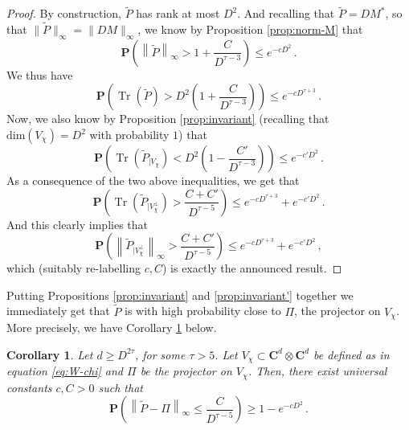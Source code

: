 \documentclass{amsart}
\newtheorem{corollary}[theorem]{Corollary}
\newcommand{\C}{\mathbf{C}}
\renewcommand{\P}{\mathbf{P}}
\renewcommand{\leq}{\leqslant}
\renewcommand{\geq}{\geqslant}
\DeclareMathOperator{\Tr}{Tr}
\begin{document}
\begin{proof}
    By construction, $\widetilde P$ has rank at most $D^2$. And recalling that $\widetilde P=DM^*$, so that $\|\widetilde P\|_\infty=\|DM\|_\infty$, we know by Proposition \ref{prop:norm-M} that
    \[ \P\left( \left\|\widetilde P\right\|_{\infty} > 1+\frac{C}{D^{\tau-3}} \right) \leq e^{-cD^2} \, . \]
    We thus have
    \[ \P\left( \Tr\left(\widetilde{P}\right) > D^2\left(1+\frac{C}{D^{\tau-3}}\right) \right) \leq e^{-cD^{\tau+3}} \, . \]
    Now, we also know by Proposition \ref{prop:invariant} (recalling that $\mathrm{dim}(V_{\chi})=D^2$ with probability $1$) that
    \[ \P\left( \Tr\left(\widetilde{P}_{|V_{\chi}}\right) < D^2\left(1-\frac{C'}{D^{\tau-3}}\right) \right) \leq e^{-c'D^2} \, . \]
    As a consequence of the two above inequalities, we get that
    \[ \P\left( \Tr\left(\widetilde{P}_{|V_{\chi}^{\perp}}\right) > \frac{C+C'}{D^{\tau-5}} \right) \leq e^{-cD^{\tau+3}}+e^{-c'D^2} \, . \]
    And this clearly implies that
    \[ \P\left( \left\|\widetilde{P}_{|V_{\chi}^{\perp}}\right\|_{\infty} > \frac{C+C'}{D^{\tau-5}} \right) \leq e^{-cD^{\tau+3}}+e^{-c'D^2} \, , \]
    which (suitably re-labelling $c,C$) is exactly the announced result.
\end{proof}

Putting Propositions \ref{prop:invariant} and \ref{prop:invariant'} together we immediately get that $\widetilde{P}$ is with high probability close to $\Pi$, the projector on $V_{\chi}$. More precisely, we have Corollary \ref{cor:P-Pi} below.

\begin{corollary} \label{cor:P-Pi}
    Let $d\geq D^{2\tau}$, for some $\tau>5$. Let $V_{\chi}\subset{\C^d\otimes\C^d}$ be defined as in equation \eqref{eq:W-chi} and $\Pi$ be the projector on $V_{\chi}$. Then, there exist universal constants $c,C>0$ such that
    \[ \P\left( \left\| \widetilde{P}-\Pi\right\|_{\infty} \leq \frac{C}{D^{\tau-5}} \right) \geq 1-e^{-cD^2} \, . \]
\end{corollary}
\end{document}
